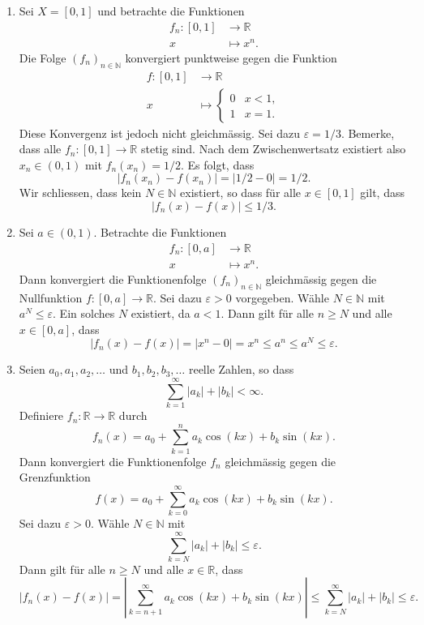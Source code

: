 \documentclass[../main.tex]{subfiles}
\begin{document}
\begin{examples}
  \leavevmode
  \begin{enumerate}[(1)]
    \item Sei $X = [0, 1]$ und betrachte die Funktionen
      \begin{align*}
        f_n \colon [0, 1] & \to \mathbb{R} \\
        x & \mapsto x^n.
      \end{align*}
      Die Folge ${(f_{n})}_{n \in \mathbb{N}}$ konvergiert
      punktweise gegen die Funktion
      \begin{align*}
        f \colon [0, 1] & \to \mathbb{R} \\
        x & \mapsto
        \begin{cases}
          0 & x < 1,\\
          1 & x = 1.
        \end{cases}
      \end{align*}
      Diese Konvergenz ist jedoch nicht gleichmässig.
      Sei dazu $\varepsilon = 1/3$.
      Bemerke, dass alle $f_n \colon [0, 1] \to \mathbb{R}$ stetig sind.
      Nach dem Zwischenwertsatz existiert also $x_n \in (0, 1)$ 
      mit $f_n(x_n) = 1/2$.
      Es folgt, dass
      \[
        |f_n(x_n) - f(x_n)| = |1/2 - 0| = 1/2.
      \]
      Wir schliessen, dass kein $N \in \mathbb{N}$ existiert, so dass
      für alle $x \in [0, 1]$ gilt, dass \[|f_n(x) - f(x)| \leq 1/3.\]
    \item Sei $a \in (0, 1)$.
      Betrachte die Funktionen
      \begin{align*}
        f_n \colon [0, a] & \to \mathbb{R} \\
        x & \mapsto x^n.
      \end{align*}
      Dann konvergiert die Funktionenfolge ${(f_{n})}_{n \in \mathbb{N}}$ 
      gleichmässig gegen die Nullfunktion $f \colon[0, a] \to \mathbb{R}$.
      Sei dazu $\varepsilon > 0$ vorgegeben. Wähle $N \in \mathbb{N}$ mit
      $a^N \leq \varepsilon$. Ein solches $N$ existiert, da $a < 1$.
      Dann gilt für alle $n \geq N$ und alle $x \in [0, a]$, dass
      \[
        |f_n(x) - f(x)| = |x^n - 0| = x^n \leq a^n \leq a^N \leq \varepsilon.
      \]
    \item Seien $a_0, a_1, a_2, \dots$  und $b_1, b_2, b_3, \dots$ reelle Zahlen,
      so dass
      \[
        \sum_{k=1}^{\infty} |a_k| + |b_k| < \infty.
      \]
      Definiere $f_n \colon \mathbb{R} \to \mathbb{R}$ durch
      \[
        f_n(x) = a_0 + \sum_{k=1}^{n} a_k \cos(kx) + b_k \sin(kx).
      \]
      Dann konvergiert die Funktionenfolge $f_n$ gleichmässig gegen die
      Grenzfunktion
      \[
        f(x) = a_0 + \sum_{k=0}^{\infty} a_k \cos(kx) + b_k \sin (kx).
      \]
      Sei dazu $\varepsilon > 0$.
      Wähle $N \in \mathbb{N}$ mit
      \[
        \sum_{k=N}^{\infty} |a_k| + |b_k| \leq \varepsilon.
      \]
      Dann gilt für alle $n \geq N$ und alle $x \in \mathbb{R}$, dass
      \[
        |f_n(x) - f(x)| = \left| \sum_{k = n + 1}^{\infty} a_k \cos(kx)
        + b_k \sin (kx)\right| \leq \sum_{k=N}^{\infty} |a_k| + |b_k| \leq \varepsilon.
      \]


\end{enumerate}
\end{examples}
\end{document}
